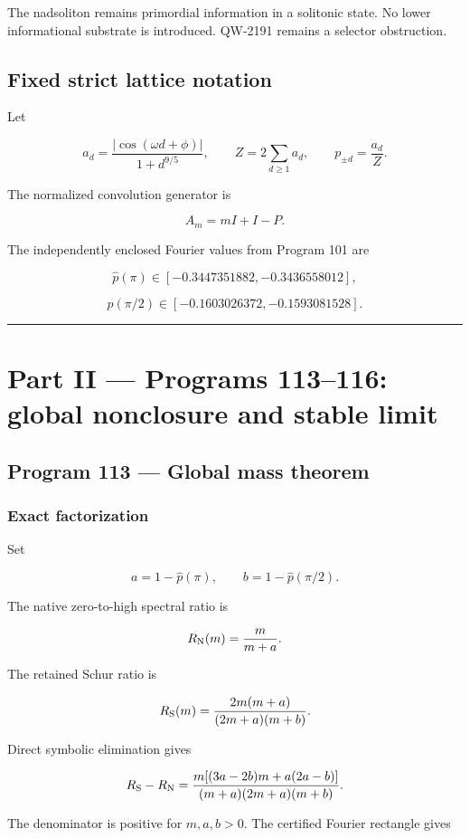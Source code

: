 \documentclass[11pt,a4paper,openany]{report}
\begin{document}
The nadsoliton remains primordial information in a solitonic state. No lower informational substrate is introduced. QW-2191 remains a selector obstruction.

\section{Fixed strict lattice notation}

Let

\[
a_d
=
\frac{|\cos(\omega d+\phi)|}
{1+d^{9/5}},
\qquad
Z=2\sum_{d\ge1}a_d,
\qquad
p_{\pm d}=\frac{a_d}{Z}.
\]

The normalized convolution generator is

\[
A_m=mI+I-P.
\]

The independently enclosed Fourier values from Program 101 are

\[
\widehat p(\pi)
\in[-0.3447351882,-0.3436558012],
\]

\[
\widehat p(\pi/2)
\in[-0.1603026372,-0.1593081528].
\]

\par\medskip\hrule\medskip

\chapter{Part II --- Programs 113--116: global nonclosure and stable limit}

\section{Program 113 --- Global mass theorem}

\subsection{Exact factorization}

Set

\[
a=1-\widehat p(\pi),
\qquad
b=1-\widehat p(\pi/2).
\]

The native zero-to-high spectral ratio is

\[
R_{\rm N}(m)=\frac{m}{m+a}.
\]

The retained Schur ratio is

\[
R_{\rm S}(m)
=
\frac{2m(m+a)}
{(2m+a)(m+b)}.
\]

Direct symbolic elimination gives

\[
R_{\rm S}-R_{\rm N}
=
\frac{
m[(3a-2b)m+a(2a-b)]
}{
(m+a)(2m+a)(m+b)
}.
\]

The denominator is positive for \(m,a,b>0\). The certified Fourier rectangle gives
\end{document}
